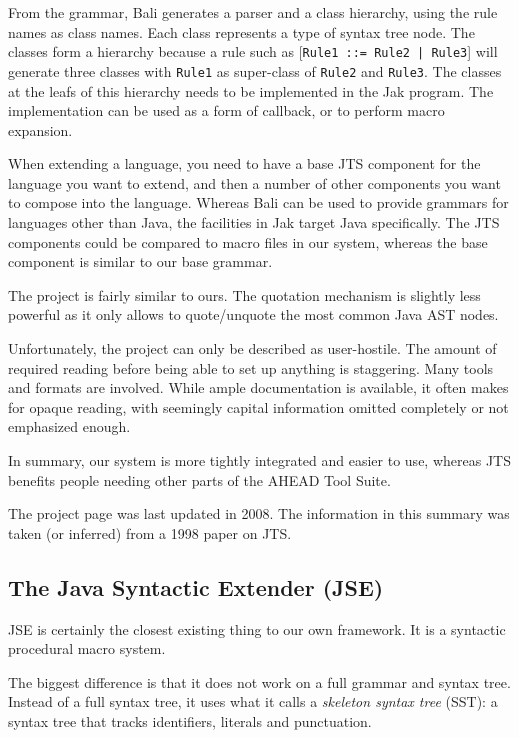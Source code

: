 From the grammar, Bali generates a parser and a class hierarchy, using the rule
names as class names. Each class represents a type of syntax tree node. The
classes form a hierarchy because a rule such as
[\lstinline{Rule1 ::= Rule2 | Rule3}] will generate three classes with
\texttt{Rule1} as super-class of \texttt{Rule2} and \texttt{Rule3}. The classes
at the leafs of this hierarchy needs to be implemented in the Jak program. The
implementation can be used as a form of callback, or to perform macro expansion.

When extending a language, you need to have a base JTS component for the
language you want to extend, and then a number of other components you want to
compose into the language. Whereas Bali can be used to provide grammars for
languages other than Java, the facilities in Jak target Java specifically. The
JTS components could be compared to macro files in our system, whereas the base
component is similar to our base grammar.

The project is fairly similar to ours. The quotation mechanism is slightly less
powerful as it only allows to quote/unquote the most common Java AST nodes.

Unfortunately, the project can only be described as user-hostile. The amount of
required reading before being able to set up anything is staggering. Many tools
and formats are involved. While ample documentation is available, it often makes
for opaque reading, with seemingly capital information omitted completely or not
emphasized enough.

In summary, our system is more tightly integrated and easier to use, whereas JTS
benefits people needing other parts of the AHEAD Tool Suite.

The project page \cite{ahead_toolsuite} was last updated in 2008. The
information in this summary was taken (or inferred) from a 1998 paper on
JTS. \cite{jakarta}

\subsection{The Java Syntactic Extender (JSE)}

JSE \cite{JSE_web} \cite{JSE} is certainly the closest existing thing to our own
framework. It is a syntactic procedural macro system.

The biggest difference is that it does not work on a full grammar and syntax
tree. Instead of a full syntax tree, it uses what it calls a \emph{skeleton
  syntax tree} (SST): a syntax tree that tracks identifiers, literals and
punctuation.

